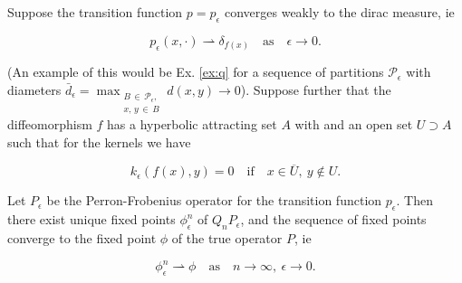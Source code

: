 \begin{proposition}
    \cite*{attr, measure, algGAIO, perturbationsbook, perturbationsart} 
    Suppose the transition function $p = p_\epsilon$ converges weakly to the 
    dirac measure, ie 

    \begin{equation}
        p_\epsilon (x, \cdot) \rightharpoonup \delta_{f(x)} 
        \quad\text{as}\quad \epsilon \to 0.
    \end{equation}

    (An example of this would be Ex. \ref{ex:q} for a sequence of partitions 
    $\mathcal{P}_\epsilon$ with diameters
    $\bar{d}_\epsilon = \max_{\substack{B\, \in\, \mathcal{P}_\epsilon,\\ x,\, y\, \in\, B}} d(x, y) \to 0$).
    Suppose further that the diffeomorphism $f$ has a hyperbolic attracting set $A$ with
    and an open set $U \supset A$ such that for the kernels we have

    \begin{equation}
        k_\epsilon (f(x), y) = 0 \quad\text{if}\quad x \in \overline{U},\ y \notin U.
    \end{equation}

    Let $P_\epsilon$ be the Perron-Frobenius operator for the transition function 
    $p_\epsilon$. Then there exist unique fixed points $\phi_\epsilon^n$ of $Q_n P_\epsilon$, 
    and the sequence of fixed points converge to the fixed point $\phi$ of the true 
    operator $P$, ie

    \begin{equation}
        \phi_\epsilon^n \rightharpoonup \phi 
        \quad\text{as}\quad n \to \infty,\ \epsilon \to 0.
    \end{equation}
\end{proposition}

